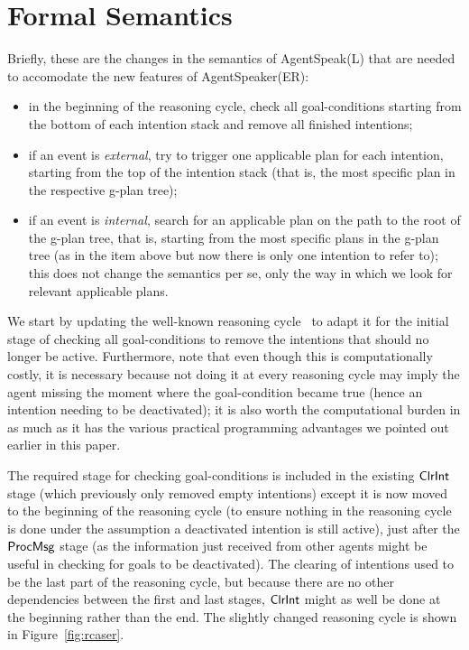 \section{Formal Semantics}
\label{sec:formalisation}


Briefly, these are the changes in the semantics of AgentSpeak(L)
that are needed to accomodate the new features of AgentSpeaker(ER):

\begin{itemize}
\item in the beginning of the reasoning cycle, check all
  goal-conditions starting from the bottom of each intention stack and
  remove all finished intentions;

\item if an event is \emph{external}, try to trigger one
  applicable plan for each intention, starting from the
  top of the intention stack (that is, the most specific plan in the
  respective g-plan tree);

\item if an event is \emph{internal}, search for an applicable plan on
  the path to the root of the g-plan tree, that is, starting from the
  most specific plans in the g-plan tree (as in the item above but now
  there is only one intention to refer to); this does not change the
  semantics per se, only the way in which we look for relevant
  applicable plans.
\end{itemize}

We start by updating the well-known reasoning cycle~\cite{bordini:07}
to adapt it for the initial stage of checking all goal-conditions to
remove the intentions that should no longer be active. Furthermore,
note that even though this is computationally costly, it is necessary
because not doing it at every reasoning cycle may imply the agent
missing the moment where the goal-condition became true (hence an
intention needing to be deactivated); it is also worth the
computational burden in as much as it has the various practical
programming advantages we pointed out earlier in this paper.


The required stage for checking goal-conditions is included in the
existing $\mathsf{ClrInt}$ stage (which previously only removed empty
intentions) except it is now moved to the beginning of the reasoning
cycle (to ensure nothing in the reasoning cycle is done under the
assumption a deactivated intention is still active), just after the
$\mathsf{ProcMsg}$ stage (as the information just received from other agents
might be useful in checking for goals to be deactivated). The clearing of
intentions used to be the last part of the reasoning cycle, but
because there are no other dependencies between the first and last
stages, $\mathsf{ClrInt}$ might as well be done at the beginning rather than
the end. The slightly changed reasoning cycle is shown in
Figure~\ref{fig:rcaser}.

